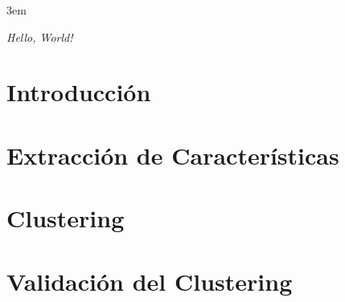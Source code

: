 


    \emergencystretch 3em

    \frontmatter



    \begin{flushright}
        \thispagestyle{empty}
        \emph{Hello, World!}
    \end{flushright}



    \chapter*{Introducción}\label{ch:introduction}
    

    \mainmatter

    \chapter{Extracción de Características}\label{ch:features}
    


    \chapter{Clustering}\label{ch:clustering}
    

    \chapter{Validación del Clustering}\label{ch:validation}
    

